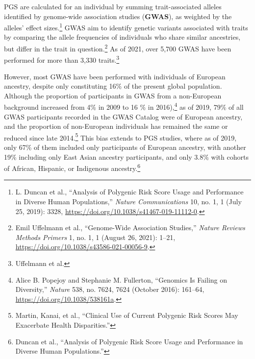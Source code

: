\documentclass[
]{book}
\begin{document}
PGS are calculated for an individual by summing trait-associated alleles identified by genome-wide association studies (\textbf{GWAS}), as weighted by the alleles' effect sizes.\footnote{L. Duncan et al., {``Analysis of Polygenic Risk Score Usage and Performance in Diverse Human Populations,''} \emph{Nature Communications} 10, no. 1, 1 (July 25, 2019): 3328, \url{https://doi.org/10.1038/s41467-019-11112-0}.} GWAS aim to identify genetic variants associated with traits by comparing the allele frequencies of individuals who share similar ancestries, but differ in the trait in question.\footnote{Emil Uffelmann et al., {``Genome-Wide Association Studies,''} \emph{Nature Reviews Methods Primers} 1, no. 1, 1 (August 26, 2021): 1--21, \url{https://doi.org/10.1038/s43586-021-00056-9}.} As of 2021, over 5,700 GWAS have been performed for more than 3,330 traits.\footnote{Uffelmann et al.}

However, most GWAS have been performed with individuals of European ancestry, despite only constituting 16\% of the present global population. Although the proportion of participants in GWAS from a non-European background increased from 4\% in 2009 to 16 \% in 2016),\footnote{Alice B. Popejoy and Stephanie M. Fullerton, {``Genomics Is Failing on Diversity,''} \emph{Nature} 538, no. 7624, 7624 (October 2016): 161--64, \url{https://doi.org/10.1038/538161a}.} as of 2019, 79\% of all GWAS participants recorded in the GWAS Catalog were of European ancestry, and the proportion of non-European individuals has remained the same or reduced since late 2014.\footnote{Martin, Kanai, et al., {``Clinical Use of Current Polygenic Risk Scores May Exacerbate Health Disparities.''}} This bias extends to PGS studies, where as of 2019, only 67\% of them included only participants of European ancestry, with another 19\% including only East Asian ancestry participants, and only 3.8\% with cohorts of African, Hispanic, or Indigenous ancestry.\footnote{Duncan et al., {``Analysis of Polygenic Risk Score Usage and Performance in Diverse Human Populations.''}}
\end{document}
